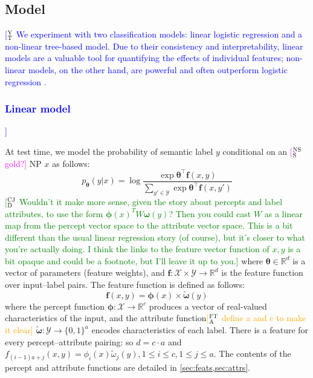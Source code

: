 \documentclass[11pt,letterpaper]{article}
\newcommand{\ensuretext}[1]{#1}
\newcommand{\cjdmarker}{\ensuretext{\textcolor{green}{\ensuremath{^{\textsc{CJ}}_{\textsc{D}}}}}}
\newcommand{\nssmarker}{\ensuretext{\textcolor{magenta}{\ensuremath{^{\textsc{NS}}_{\textsc{S}}}}}}
\newcommand{\ytmarker}{\ensuretext{\textcolor{blue}{\ensuremath{^{\textsc{Y}}_{\textsc{T}}}}}}
\newcommand{\ftamarker}{\ensuretext{\textcolor{orange}{\ensuremath{^{\textsc{FT}}_{\textsc{A}}}}}}
\newcommand{\arkcomment}[3]{\ensuretext{\textcolor{#3}{[#1 #2]}}}
\newcommand{\cjd}[1]{\arkcomment{\cjdmarker}{#1}{green}}
\newcommand{\nss}[1]{\arkcomment{\nssmarker}{#1}{magenta}}
\newcommand{\yt}[1]{\arkcomment{\ytmarker}{#1}{blue}}
\newcommand{\fta}[1]{\arkcomment{\ftamarker}{#1}{orange}}
\begin{document}
\subsection{Model}
\yt{
We experiment with two classification models: linear logistic regression and a non-linear tree-based model. 
Due to their consistency and interpretability, linear models are a valuable tool for quantifying the effects of individual features; non-linear models, on the other hand, are powerful and often outperform logistic regression \citep{PerlichEtAl:2003}.
\subsubsection{Linear model}}

At test time, we model the probability of semantic label $y$ 
conditional on an \nss{gold?} NP $x$ as follows:
\begin{equation}
p_{\boldsymbol{\theta}}(y | x) = \log{\frac{\exp{\boldsymbol{\theta}^{\top}\mathbf{f}(x,y)}}{\sum_{y' \in \mathcal{Y}}\exp{\boldsymbol{\theta}^{\top}\mathbf{f}(x,y')}}}
\end{equation}
\cjd{Wouldn't it make more sense, given the story about percepts and label attributes, to use the form $\boldsymbol{\phi}(x)^{T} W \boldsymbol{\omega}(y)$? Then you could cast $W$ as a linear map from the percept vector space to the attribute vector space. This is a bit different than the usual linear regression story (of course), but it's closer to what you're actually doing. I think the links to the feature vector function of $x,y$ is a bit opaque and could be a footnote, but I'll leave it up to you.}
where $\boldsymbol{\theta} \in \mathbb{R}^d$ is a vector of parameters (feature weights), and 
$\mathbf{f}: \mathcal{X} \times \mathcal{Y} \rightarrow \mathbb{R}^d$ is the feature function over input--label pairs.
The feature function is defined as follows:
\begin{equation}
\mathbf{f}(x,y) = \boldsymbol{\phi}(x) \times \tilde{\boldsymbol{\omega}}(y)
\end{equation}
where the percept function $\boldsymbol{\phi}: \mathcal{X} \rightarrow \mathbb{R}^c$ 
produces a vector of real-valued characteristics of the input, and  
the attribute function\fta{define a and c to make it clear} $\tilde{\boldsymbol{\omega}}: \mathcal{Y} \rightarrow \{0,1\}^a$
encodes characteristics of each label.
There is a feature for every percept--attribute pairing: so
$d = c \cdot a$ and $f_{(i-1)a+j}(x,y) = \phi_i(x)\tilde{\omega}_j(y), 1 \leq i \leq c, 1 \leq j \leq a$.
The contents of the percept and attribute functions are detailed in \cref{sec:feats,sec:attrs}.
\end{document}
